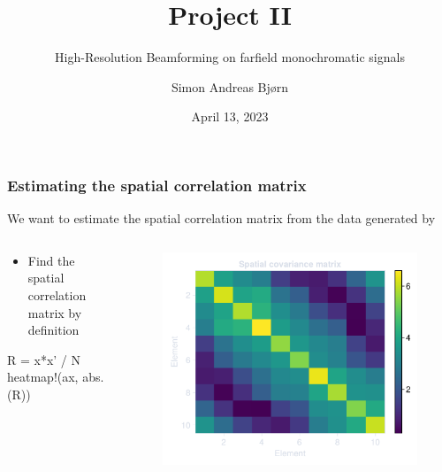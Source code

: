 \documentclass[compress,aspectratio=169]{beamer}
\title{Project II}
\subtitle{High-Resolution Beamforming on farfield monochromatic signals}
\author{Simon Andreas Bjørn}
\date{April 13, 2023}
\begin{document}
\begin{frame}
    \maketitle
\end{frame}

\begin{frame}[fragile] %
    \frametitle{Estimating the spatial correlation matrix}
    We want to estimate the spatial correlation matrix from the data generated
    by 
    \begin{columns}
        \begin{column}{0.5\textwidth}
            \begin{itemize}
                \item Find the spatial correlation matrix by definition
            \end{itemize}
            \begin{jllisting}[gobble=16]
                R = x*x' / N
                heatmap!(ax, abs.(R))
            \end{jllisting}
        \end{column}
        \begin{column}{0.5\textwidth}
            \begin{figure}
                \includegraphics[width=\columnwidth]{"../a.pdf"}
            \end{figure}
        \end{column}
    \end{columns}
\end{frame} 
\end{document}
